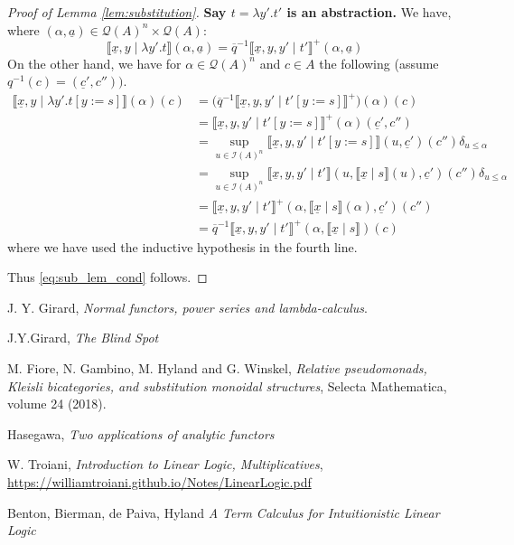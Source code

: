 \documentclass[12pt]{article}
\theoremstyle{plain}
\theoremstyle{definition}
\newcommand{\call}[1]{\mathcal{#1}}
\newcommand{\Ical}{\call{I}}
\newcommand{\Qcal}{\call{Q}}
\begin{document}
\begin{proof}[Proof of Lemma \ref{lem:substitution}]
		\textbf{Say $t = \lambda y'. t'$ is an abstraction.} We have, where $(\alpha, \underline{a}) \in \Qcal(A)^n \times \Qcal(A)$:
		\begin{equation}
			\llbracket \underline{x}, y \mid \lambda y'.t\rrbracket(\alpha, \underline{a}) = \overline{q}^{-1}\llbracket \underline{x}, y, y' \mid t' \rrbracket^+(\alpha, \underline{a})
			\end{equation}
		On the other hand, we have for $\alpha \in \Qcal(A)^n$ and $c \in A$ the following (assume $q^{-1}(c) = (\underline{c}', c''))$.
		\begin{align*}
			\llbracket \underline{x}, y \mid \lambda y'.t[y:=s]\rrbracket(\alpha)(c) &= \big(\overline{q}^{-1} \llbracket \underline{x}, y, y' \mid t'[y:=s]\rrbracket^+\big)(\alpha)(c)\\
			&= \llbracket \underline{x}, y, y' \mid t'[y :=s]\rrbracket^+(\alpha)(\underline{c}', c'')\\
			&= \operatorname{sup}_{u \in \Ical(A)^n}\llbracket \underline{x}, y, y' \mid t'[y := s]\rrbracket(u, \underline{c}')(c'')\delta_{u \leq \alpha}\\
			&= \operatorname{sup}_{u \in \Ical(A)^n}\llbracket \underline{x}, y, y' \mid t' \rrbracket (u, \llbracket \underline{x} \mid s \rrbracket(u), \underline{c}')(c'')\delta_{u \leq \alpha}\\
			&= \llbracket \underline{x}, y, y' \mid t' \rrbracket^+ (\alpha, \llbracket \underline{x} \mid s \rrbracket(\alpha), \underline{c}')(c'')\\
			&= \overline{q}^{-1}\llbracket \underline{x}, y, y' \mid t' \rrbracket^+(\alpha, \llbracket \underline{x} \mid s \rrbracket)(c)
			\end{align*}
		where we have used the inductive hypothesis in the fourth line.
		
		Thus \eqref{eq:sub_lem_cond} follows.
		\end{proof}

\begin{thebibliography}{9}
	 J. Y. Girard, \emph{Normal functors, power series and lambda-calculus}.
	
	 J.Y.Girard, \emph{The Blind Spot}

	 M. Fiore, N. Gambino, M. Hyland and G. Winskel, \emph{Relative pseudomonads, Kleisli bicategories,
and substitution monoidal structures}, Selecta Mathematica, volume 24 (2018).
	
	 Hasegawa, \emph{Two applications of analytic functors}
	
	 W. Troiani, \emph{Introduction to Linear Logic, Multiplicatives}, \url{https://williamtroiani.github.io/Notes/LinearLogic.pdf}
	
	 Benton, Bierman, de Paiva, Hyland \emph{A Term Calculus for Intuitionistic Linear Logic}
	\end{thebibliography}
\end{document}

